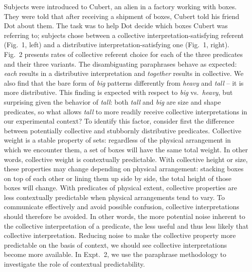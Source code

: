 \documentclass[12pt]{article}
\begin{document}
Subjects were introduced to Cubert, an alien in a factory working with boxes. They were told that after receiving a shipment of boxes, Cubert told his friend Dot about them. The task was to help Dot decide which boxes Cubert was referring to; subjects chose between a collective interpretation-satisfying referent (Fig.~1, left) and a distributive interpretation-satisfying one (Fig.~1, right). Fig.~2 presents rates of collective referent choice for each of the three predicates and their three variants. The disambiguating paraphrases behave as expected: \emph{each} results in a distributive interpretation and \emph{together} results in collective. We also find that the bare form of \emph{big} patterns differently from \emph{heavy} and \emph{tall} -- it is more distributive. This finding is expected with respect to \textit{big} vs.~\textit{heavy}, but surprising given the behavior of \textit{tall}: both \emph{tall} and \emph{big} are size and shape predicates, so what allows \emph{tall} to more readily receive collective interpretations in our experimental context?  %
To identify this factor, consider first the difference between potentially collective and stubbornly distributive predicates.
Collective weight is a stable property of sets: regardless of the physical arrangement in which we encounter them, a set of boxes will have the same total weight. In other words, collective weight is contextually predictable. With collective height or size, these properties may change depending on physical arrangement: stacking boxes on top of each other or lining them up side by side, the total height of those boxes will change. With predicates of physical extent, collective properties are less contextually predictable when physical arrangements tend to vary. To communicate effectively and avoid possible confusion, collective interpretations should therefore be avoided. In other words, the more potential noise inherent to the collective interpretation of a predicate, the less useful and thus less likely that collective interpretation. Reducing noise to make the collective property more predictable on the basis of context, we should see collective interpretations become more available. In Expt.~2, we use the paraphrase methodology to investigate the role of contextual predictability.
\end{document}
